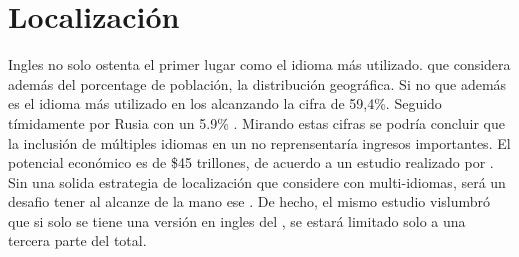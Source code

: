 




\section{Localización}

Ingles no solo ostenta el primer lugar como el idioma más utilizado. \rankingCPT que considera además del porcentage de población, la distribución geográfica. Si no que además es el idioma más utilizado en los \websitesINT alcanzando la cifra de 59,4\%. Seguido tímidamente por Rusia con un 5.9\% \cite{online_world_wide_languages}. Mirando estas cifras se podría concluir que la inclusión de múltiples idiomas en un \siteINT \ecommerceCOM	no reprensentaría ingresos importantes.
El potencial económico \online es de \$45 trillones, de acuerdo a un estudio realizado por \commonSenseAdvisoryNAME \cite{online_world_global_oportunity_multi_languages}.  Sin una solida estrategia de localización que considere \websitesINT \ecommerceCOM con multi-idiomas, será  un desafio tener al alcanze de la mano ese \revenueCOM. De hecho, el mismo estudio vislumbró que si solo se tiene una versión en ingles del  \siteINT, se estará limitado solo a una tercera parte del total.


